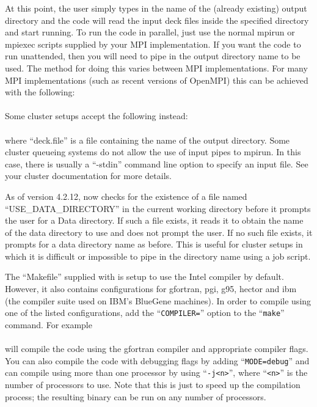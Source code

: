 At this point, the user simply types in the name of the (already existing)
output directory and the code will read the input deck files inside the
specified directory and start running. To run the code in parallel, just use
the normal mpirun or mpiexec scripts supplied by your MPI implementation. If
you want the code to run unattended, then you will need to pipe in the
output directory name to be used. The method for doing this varies between MPI
implementations. For many MPI implementations (such as recent versions of
OpenMPI) this can be achieved with the following:\\
\indent{}\\
Some cluster setups accept the following instead:\\
\indent{}\\
where ``deck.file'' is a file containing the name of the output directory.
Some cluster queueing systems do not
allow the use of input pipes to mpirun. In this case, there is usually a
``-stdin'' command line option to specify an input file. See your cluster
documentation for more details.

As of version 4.2.12, {\EPOCH} now checks for the existence of a file named
``USE\_DATA\_DIRECTORY'' in the current working directory before it prompts
the user for a Data directory. If such a file exists, it reads it to obtain the name of the data
directory to use and does not prompt the user. If no such file exists, it
prompts for a data directory name as before.
This is useful for cluster setups in which it is difficult or
impossible to pipe in the directory name using a job script.

The ``Makefile'' supplied with {\EPOCH} is setup to use the Intel compiler
by default. However, it also contains configurations for gfortran, pgi, g95,
hector and ibm (the compiler suite used on IBM's BlueGene machines).
In order to compile using one of the listed configurations, add the
``\verb|COMPILER=|'' option to the ``\verb|make|'' command. For example\\
\indent{}\\
will compile the code using the gfortran compiler and appropriate compiler
flags.
You can also compile the code with debugging flags by adding
``\verb|MODE=debug|'' and can compile using more than one processor by
using ``\verb|-j<n>|'', where ``\verb|<n>|''
is the number of processors to use. Note that this is just to speed up the
compilation process; the resulting binary can be run on any number of
processors.

